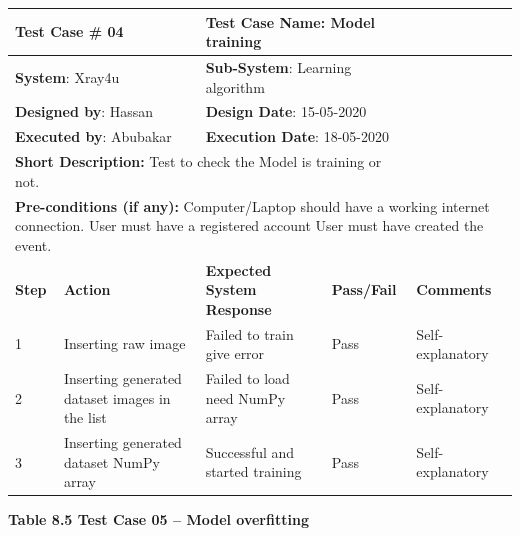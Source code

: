 \documentclass{article} %
\begin{document}
\begin{tabular}{|p{0.3in}|p{1.2in}|p{1.5in}|p{0.6in}|p{0.6in}|} \hline 
\multicolumn{2}{|p{1in}|}{\textbf{Test Case} \# 04} & \multicolumn{2}{|p{2.0in}|}{\textbf{Test Case Name}: Model training} &  \\ \hline 
\multicolumn{2}{|p{1in}|}{\textbf{System}: Xray4u} & \multicolumn{2}{|p{2.0in}|}{\textbf{Sub-System}: Learning algorithm } &  \\ \hline 
\multicolumn{2}{|p{1in}|}{\textbf{Designed by}: Hassan} & \multicolumn{2}{|p{2.0in}|}{\textbf{Design Date}: 15-05-2020} &  \\ \hline 
\multicolumn{2}{|p{1in}|}{\textbf{Executed by}: Abubakar} & \multicolumn{2}{|p{2.0in}|}{\textbf{Execution Date}: 18-05-2020} &  \\ \hline 
\multicolumn{4}{|p{1in}|}{\textbf{Short Description:} Test to check the Model is training or not.} &  \\ \hline 
\multicolumn{5}{|p{1in}|}{\textbf{Pre-conditions (if any): }Computer/Laptop should have a working internet connection. User must have a registered account User must have created the event.} \\ \hline 
\textbf{Step} & \textbf{Action} & \textbf{Expected System Response} & \textbf{Pass/Fail} & \textbf{Comments} \\ \hline 
1 & Inserting raw image  & Failed to train give error & Pass & Self-explanatory \\ \hline 
2 & Inserting generated dataset images in the list & Failed to load need NumPy array & Pass & Self-explanatory \\ \hline 
3 & Inserting generated dataset NumPy array & Successful and started training & Pass & Self-explanatory \\ \hline 
\end{tabular}

\eject 

\noindent \textbf{Table 8.5 Test Case 05 -- Model overfitting}
\end{document}
